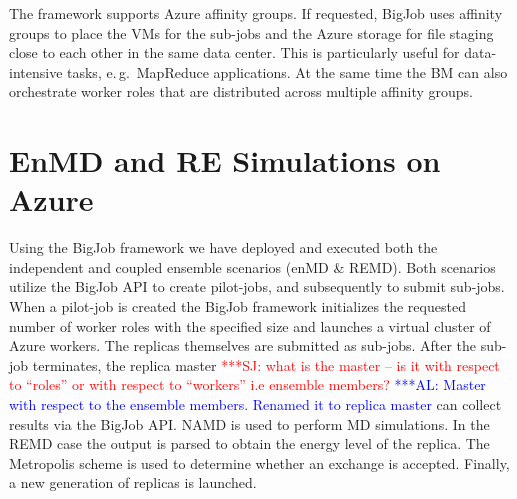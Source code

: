 \documentclass[conference,final]{IEEEtran}
\newcommand{\up}{\vspace*{-1em}}
\newcommand{\alnote}[1]{ {\textcolor{blue} { ***AL: #1 }}}
\newcommand{\jhanote}[1]{ {\textcolor{red} { ***SJ: #1 }}}
\newcommand{\alnote}[1]{}
\newcommand{\jhanote}[1]{}
\begin{document}
The framework supports Azure affinity groups.  %
If requested, BigJob uses affinity groups to place the VMs for the
sub-jobs and the Azure storage for file staging close to each other in
the same data center.  This is particularly useful for data-intensive
tasks, e.\,g.\ MapReduce applications. At the same time the BM can
also orchestrate worker roles that are distributed across multiple
affinity groups.




\up
\section{EnMD and RE Simulations on Azure}
\label{sec:enMD-REMD}
\up Using the BigJob framework we have deployed and executed both the
independent and coupled ensemble scenarios (enMD \& REMD).  Both
scenarios utilize the BigJob API to create pilot-jobs, and
subsequently to submit sub-jobs. When a pilot-job is created the
BigJob framework initializes the requested number of worker roles with
the specified size and launches a virtual cluster of Azure
workers. The replicas themselves are submitted as sub-jobs.  After the
sub-job terminates, the replica master \jhanote{what is the master -- is it
  with respect to ``roles'' or with respect to ``workers'' i.e
  ensemble members?} \alnote{Master with respect to the ensemble members. Renamed
  it to replica master} can collect results via the BigJob API.  NAMD is
used to perform MD simulations.  In the REMD case the output is parsed
to obtain the energy level of the replica.  The Metropolis scheme is
used to determine whether an exchange is accepted. Finally, a new
generation of replicas is launched.

\end{document}
